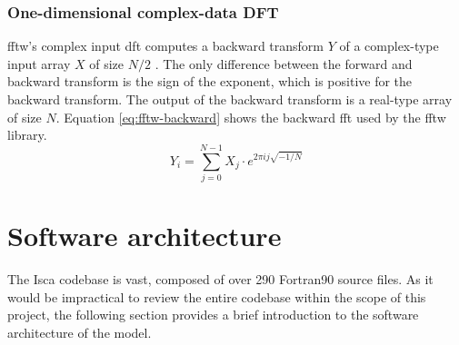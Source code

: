 \documentclass[a4paper,11pt]{report}
\begin{document}
\subsubsection{One-dimensional complex-data DFT}
\gls{fftw}'s complex input \gls{dft} computes a backward transform $Y$ of a complex-type input array $X$ of size $N/2$ \cite{frigo2005design}. The only difference between the forward and backward transform is the sign of the exponent, which is positive for the backward transform. The output of the backward transform is a real-type array of size $N$. Equation \ref{eq:fftw-backward} shows the backward \gls{fft} used by the \gls{fftw} library.
\begin{equation}
Y _ { i } = \sum _ { j = 0 } ^ { N - 1 } X _ { j } \cdot e ^ { 2 \pi i j \sqrt { - 1 / N } }
\label{eq:fftw-backward}
\end{equation}


\section{Software architecture}
The Isca codebase is vast, composed of over 290 Fortran90 source files. As it would be impractical to review the entire codebase within the scope of this project, the following section provides a brief introduction to the software architecture of the model.
\end{document}
